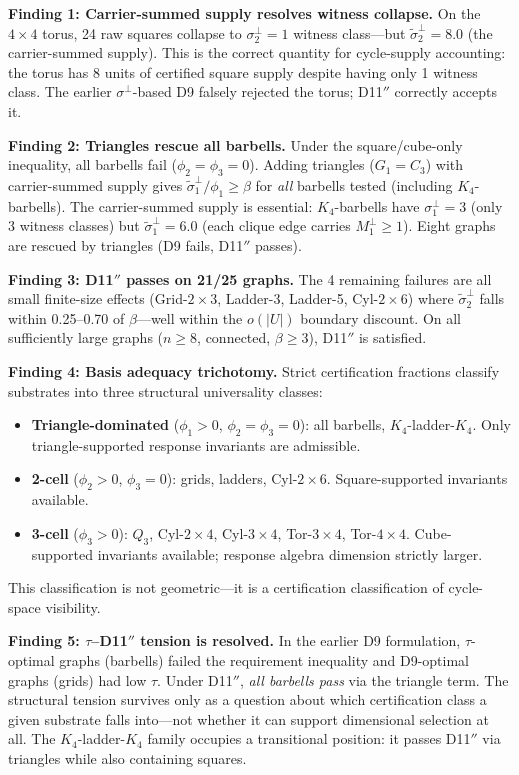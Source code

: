 \documentclass[11pt,a4paper]{article}
\theoremstyle{definition}
\theoremstyle{remark}
\begin{document}
\textbf{Finding 1: Carrier-summed supply resolves witness collapse.} On the $4{\times}4$ torus, 24 raw squares collapse to $\sigma_2^\perp = 1$ witness class---but $\tilde\sigma_2^\perp = 8.0$ (the carrier-summed supply). This is the correct quantity for cycle-supply accounting: the torus has 8 units of certified square supply despite having only 1 witness class. The earlier $\sigma^\perp$-based D9 falsely rejected the torus; D11$''$ correctly accepts it.

\textbf{Finding 2: Triangles rescue all barbells.} Under the square/cube-only inequality, all barbells fail ($\phi_2 = \phi_3 = 0$). Adding triangles ($G_1 = C_3$) with carrier-summed supply gives $\tilde\sigma_1^\perp / \phi_1 \geq \beta$ for \emph{all} barbells tested (including $K_4$-barbells). The carrier-summed supply is essential: $K_4$-barbells have $\sigma_1^\perp = 3$ (only 3 witness classes) but $\tilde\sigma_1^\perp = 6.0$ (each clique edge carries $M_1^\perp \geq 1$). Eight graphs are rescued by triangles (D9 fails, D11$''$ passes).

\textbf{Finding 3: D11$''$ passes on 21/25 graphs.} The 4 remaining failures are all small finite-size effects (Grid-$2{\times}3$, Ladder-3, Ladder-5, Cyl-$2{\times}6$) where $\tilde\sigma_2^\perp$ falls within 0.25--0.70 of $\beta$---well within the $o(|U|)$ boundary discount. On all sufficiently large graphs ($n \geq 8$, connected, $\beta \geq 3$), D11$''$ is satisfied.

\textbf{Finding 4: Basis adequacy trichotomy.} Strict certification fractions classify substrates into three structural universality classes:
\begin{itemize}[nosep]
  \item \textbf{Triangle-dominated} ($\phi_1 > 0$, $\phi_2 = \phi_3 = 0$): all barbells, $K_4$-ladder-$K_4$. Only triangle-supported response invariants are admissible.
  \item \textbf{2-cell} ($\phi_2 > 0$, $\phi_3 = 0$): grids, ladders, Cyl-$2{\times}6$. Square-supported invariants available.
  \item \textbf{3-cell} ($\phi_3 > 0$): $Q_3$, Cyl-$2{\times}4$, Cyl-$3{\times}4$, Tor-$3{\times}4$, Tor-$4{\times}4$. Cube-supported invariants available; response algebra dimension strictly larger.
\end{itemize}
This classification is not geometric---it is a certification classification of cycle-space visibility.

\textbf{Finding 5: $\tau$--D11$''$ tension is resolved.} In the earlier D9 formulation, $\tau$-optimal graphs (barbells) failed the requirement inequality and D9-optimal graphs (grids) had low $\tau$. Under D11$''$, \emph{all barbells pass} via the triangle term. The structural tension survives only as a question about which certification class a given substrate falls into---not whether it can support dimensional selection at all. The $K_4$-ladder-$K_4$ family occupies a transitional position: it passes D11$''$ via triangles while also containing squares.
\end{document}
